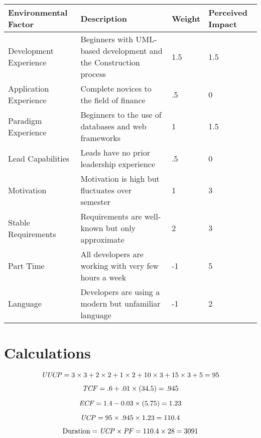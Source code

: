 \renewcommand\arraystretch{2}
\begin{longtable}{|p{1.2in}|p{3.6in}|p{0.5in}|p{.7in}|}
\hline
{\large \color{color1}Environmental Factor}&{\large \color{color1}Description}&{\large \color{color1}Weight}&{\large \color{color1}Perceived Impact} \\ \hline
Development Experience & Beginners with UML-based development and the Construction process & 1.5 & 1.5 \\ \hline
Application Experience & Complete novices to the field of finance & .5 & 0 \\ \hline
Paradigm Experience & Beginners to the use of databases and web
frameworks & 1 & 1.5 \\ \hline
Lead Capabilities & Leads have no prior leadership experience
& .5 & 0 \\ \hline
Motivation & Motivation is high but fluctuates over semester & 1 & 3 \\ \hline
Stable Requirements & Requirements are well-known but only approximate & 2 & 3 \\ \hline
Part Time & All developers are working with very few hours a week & -1 & 5 \\ \hline
Language & Developers are using a modern but unfamiliar language & -1 & 2 \\ \hline
\end{longtable}

\section{Calculations}

$$ \mathit{UUCP} = 3\times 3 + 2\times 2 + 1\times 2 + 10 \times 3 + 15 \times 3 + 5 = 95 $$

$$ \mathit{TCF} = .6 + .01 \times (34.5) = .945 $$

$$ \mathit{ECF} = 1.4 -0.03 \times (5.75) = 1.23 $$

$$ \mathit{UCP} = 95 \times .945 \times 1.23 = 110.4 $$

$$ \mbox{Duration} = \mathit{UCP} \times \mathit{PF} = 110.4 \times 28 = 3091 $$